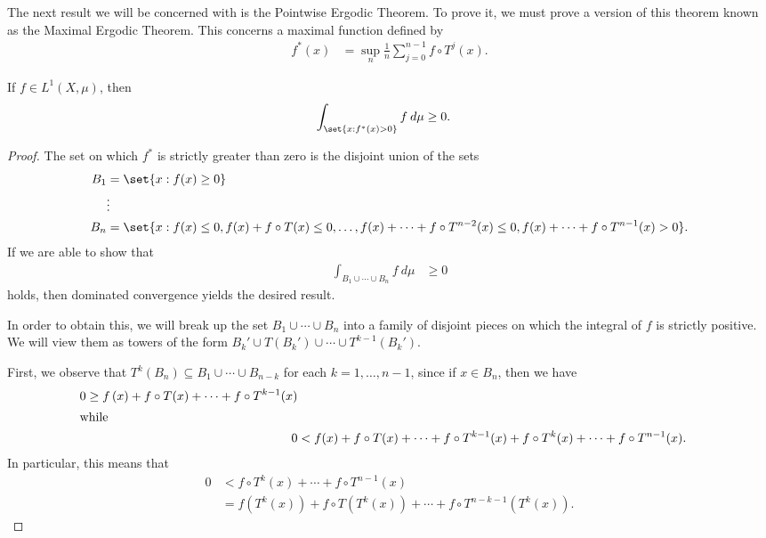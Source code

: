 \documentclass[10pt]{mypackage}
\begin{document}
The next result we will be concerned with is the Pointwise Ergodic Theorem. To prove it, we must prove a version of this theorem known as the Maximal Ergodic Theorem. This concerns a maximal function defined by
\begin{align*}
  f^{\ast}\left( x \right) &= \sup_{n} \frac{1}{n}\sum_{j=0}^{n-1} f\circ T^{j}(x).
\end{align*}
\begin{theorem}
  If $f\in L^1\left( X,\mu \right)$, then
  \begin{align*}
    \int_{\set{x:f^{\ast}(x) > 0}}^{} f\:d\mu &\geq 0.
  \end{align*}
\end{theorem}
\begin{proof}
  The set on which $f^{\ast}$ is strictly greater than zero is the disjoint union of the sets
  \begin{align*}
    B_1 &= \set{x : f(x) \geq 0}\\
        &\vdots\\
    B_n &= \set{x : f(x)\leq 0,f(x) + f\circ T(x) \leq 0,\dots,f(x) + \cdots + f\circ T^{n-2}(x) \leq 0, f(x) + \cdots + f\circ T^{n-1}(x) > 0}.
  \end{align*}
  If we are able to show that
  \begin{align*}
    \int_{B_1\cup\cdots\cup B_n}^{} f\:d\mu &\geq 0
  \end{align*}
  holds, then dominated convergence yields the desired result.

  In order to obtain this, we will break up the set $B_1\cup\cdots\cup B_n$ into a family of disjoint pieces on which the integral of $f$ is strictly positive. We will view them as towers of the form $B_k'\cup T\left( B_k' \right)\cup\cdots\cup T^{k-1}\left( B_k' \right)$.

  First, we observe that $T^{k}\left( B_n \right)\subseteq B_1\cup\cdots\cup B_{n-k}$ for each $k=1,\dots,n-1$, since if $x\in B_n$, then we have
  \begin{align*}
    0\geq f\left( x \right) + f\circ T(x) + \cdots + f\circ T^{k-1}(x)\\
      \intertext{while}
      0 &< f(x) + f\circ T(x) + \cdots + f\circ T^{k-1}(x) + f\circ T^{k}(x) + \cdots + f\circ T^{n-1}(x).
  \end{align*}
  In particular, this means that
  \begin{align*}
    0 &< f\circ T^{k}(x) + \cdots + f\circ T^{n-1}(x)\\
      &= f\left( T^{k}(x) \right) + f\circ T\left( T^{k}(x) \right) + \cdots + f\circ T^{n-k-1}\left( T^{k}(x) \right).
  \end{align*}


\end{proof}
\end{document}
